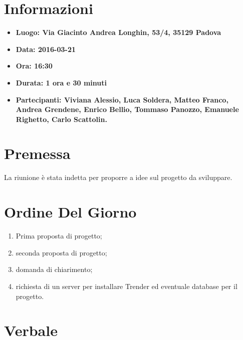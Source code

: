 \documentclass[a4paper,titlepage]{article}
\begin{document}
\maketitle

\newpage
\tableofcontents

\newpage
\section{Informazioni}
\label{sec:Informazioni}

\begin{itemize}
  \item \textbf{Luogo: Via Giacinto Andrea Longhin, 53/4, 35129 Padova}
  \item \textbf{Data: 2016-03-21}
  \item \textbf{Ora: 16:30}
  \item \textbf{Durata: 1 ora e 30 minuti}
  \item \textbf{Partecipanti: Viviana Alessio, Luca Soldera, Matteo Franco, Andrea Grendene, Enrico Bellio, Tommaso Panozzo, Emanuele Righetto, Carlo Scattolin.}
\end{itemize}

\newpage
\section{Premessa}

La riunione è stata indetta per proporre a \PROPONENTE{} idee sul progetto da sviluppare.

\section{Ordine Del Giorno}
\label{sec:OrdineDelGiorno}

\begin{enumerate}
  \item Prima proposta di progetto;
  \item seconda proposta di progetto;
  \item domanda di chiarimento;
  \item richiesta di un server per installare Trender ed eventuale database per il progetto.
\end{enumerate}

\newpage
\section{Verbale}
\label{sec:Verbale}
\end{document}
